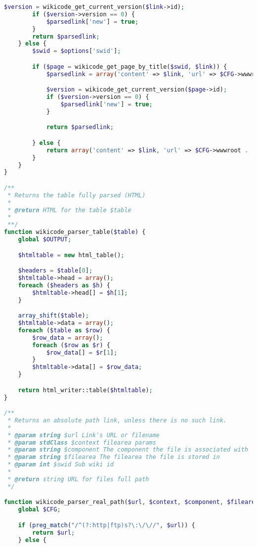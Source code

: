 \begin{lstlisting}[language=PHP]
        $version = wikicode_get_current_version($link->id);
        if ($version->version == 0) {
            $parsedlink['new'] = true;
        }
        return $parsedlink;
    } else {
        $swid = $options['swid'];

        if ($page = wikicode_get_page_by_title($swid, $link)) {
            $parsedlink = array('content' => $link, 'url' => $CFG->wwwroot . '/mod/wikicode/view.php?pageid=' . $page->id, 'new' => false, 'link_info' => array('link' => $link, 'pageid' => $page->id, 'new' => false));

            $version = wikicode_get_current_version($page->id);
            if ($version->version == 0) {
                $parsedlink['new'] = true;
            }

            return $parsedlink;

        } else {
            return array('content' => $link, 'url' => $CFG->wwwroot . '/mod/wikicode/create.php?swid=' . $swid . '&amp;title=' . urlencode($link) . '&amp;action=new', 'new' => true, 'link_info' => array('link' => $link, 'new' => true, 'pageid' => 0));
        }
    }
}

/**
 * Returns the table fully parsed (HTML)
 *
 * @return HTML for the table $table
 *
 **/
function wikicode_parser_table($table) {
    global $OUTPUT;

    $htmltable = new html_table();

    $headers = $table[0];
    $htmltable->head = array();
    foreach ($headers as $h) {
        $htmltable->head[] = $h[1];
    }

    array_shift($table);
    $htmltable->data = array();
    foreach ($table as $row) {
        $row_data = array();
        foreach ($row as $r) {
            $row_data[] = $r[1];
        }
        $htmltable->data[] = $row_data;
    }

    return html_writer::table($htmltable);
}

/**
 * Returns an absolute path link, unless there is no such link.
 *
 * @param string $url Link's URL or filename
 * @param stdClass $context filearea params
 * @param string $component The component the file is associated with
 * @param string $filearea The filearea the file is stored in
 * @param int $swid Sub wiki id
 *
 * @return string URL for files full path
 */

function wikicode_parser_real_path($url, $context, $component, $filearea, $swid) {
    global $CFG;

    if (preg_match("/^(?:http|ftp)s?\:\/\//", $url)) {
        return $url;
    } else {


\end{lstlisting}
